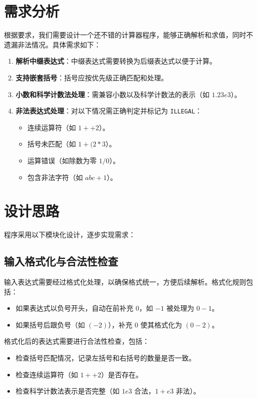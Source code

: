 \documentclass[UTF8]{ctexart}
\begin{document}
\section{需求分析}
根据要求，我们需要设计一个还不错的计算器程序，能够正确解析和求值，同时不遗漏非法情况。具体需求如下：
\begin{enumerate}
    \item \textbf{解析中缀表达式}：中缀表达式需要转换为后缀表达式以便于计算。
    \item \textbf{支持嵌套括号}：括号应按优先级正确匹配和处理。
    \item \textbf{小数和科学计数法处理}：需兼容小数以及科学计数法的表示（如 $1.23e3$）。
    \item \textbf{非法表达式处理}：对以下情况需正确判定并标记为 \texttt{ILLEGAL}：
    \begin{itemize}
        \item 连续运算符（如 $1++2$）。
        \item 括号未匹配（如 $1+(2*3$）。
        \item 运算错误（如除数为零 $1/0$）。
        \item 包含非法字符（如 $abc+1$）。
    \end{itemize}
\end{enumerate}

\section{设计思路}
程序采用以下模块化设计，逐步实现需求：
\subsection{输入格式化与合法性检查}
输入表达式需要经过格式化处理，以确保格式统一，方便后续解析。格式化规则包括：
\begin{itemize}
    \item 如果表达式以负号开头，自动在前补充 $0$，如 $-1$ 被处理为 $0-1$。
    \item 如果括号后跟负号（如 $( -2)$），补充 $0$ 使其格式化为 $(0-2)$。
\end{itemize}
格式化后的表达式需要进行合法性检查，包括：
\begin{itemize}
    \item 检查括号匹配情况，记录左括号和右括号的数量是否一致。
    \item 检查连续运算符（如 $1++2$）是否存在。
    \item 检查科学计数法表示是否完整（如 $1e3$ 合法，$1+e3$ 非法）。
\end{itemize}
\end{document}
